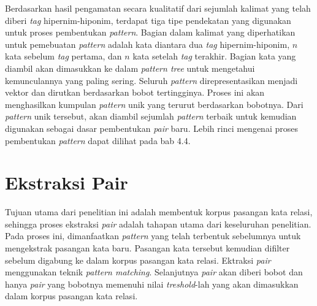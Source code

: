 Berdasarkan hasil pengamatan secara kualitatif dari sejumlah kalimat yang telah diberi \textit{tag} hipernim-hiponim, terdapat tiga tipe pendekatan yang digunakan untuk proses pembentukan \textit{pattern}. Bagian dalam kalimat yang diperhatikan untuk pemebuatan \textit{pattern} adalah kata diantara dua \textit{tag} hipernim-hiponim, $n$ kata sebelum \textit{tag} pertama, dan $n$ kata setelah \textit{tag} terakhir. Bagian kata yang diambil akan dimasukkan ke dalam \textit{pattern tree} untuk mengetahui kemunculannya yang paling sering. Seluruh \textit{pattern} direpresentasikan menjadi vektor dan dirutkan berdasarkan bobot tertingginya. Proses ini akan menghasilkan kumpulan \textit{pattern} unik yang terurut berdasarkan bobotnya. Dari \textit{pattern} unik tersebut, akan diambil sejumlah \textit{pattern} terbaik untuk kemudian digunakan sebagai dasar pembentukan \textit{pair} baru. Lebih rinci mengenai proses pembentukan \textit{pattern} dapat dilihat pada bab 4.4.
%


\section{Ekstraksi Pair}
Tujuan utama dari penelitian ini adalah membentuk korpus pasangan kata relasi, sehingga proses ekstraksi \textit{pair} adalah tahapan utama dari keseluruhan penelitian. Pada proses ini, dimanfaatkan \textit{pattern} yang telah terbentuk sebelumnya untuk mengekstrak pasangan kata baru. Pasangan kata tersebut kemudian difilter sebelum digabung ke dalam korpus pasangan kata relasi. Ektraksi \textit{pair} menggunakan teknik \textit{pattern matching}. Selanjutnya \textit{pair} akan diberi bobot dan hanya \textit{pair} yang bobotnya memenuhi nilai \textit{treshold}-lah yang akan dimasukkan dalam korpus pasangan kata relasi.

